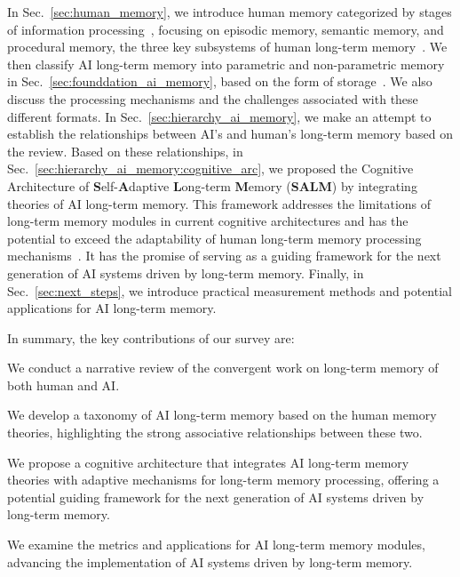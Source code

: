 \documentclass[journal,hideappendix]{vgtc}
\newenvironment{j_itemize}{
\begin{itemize}[]
  \setlength{\itemsep}{3pt}
  \setlength{\parskip}{0pt}
  \setlength{\parsep}{0pt}
}{\end{itemize}}
\begin{document}
In Sec.~\ref{sec:human_memory}, we introduce human memory categorized by stages of information processing~\cite{atkinson1968human}, focusing on episodic memory, semantic memory, and procedural memory, the three key subsystems of human long-term memory~\cite{tulving1972episodic,tulving1973encoding,tulving1985memory}. 
We then classify AI long-term memory into parametric and non-parametric memory in Sec.~\ref{sec:founddation_ai_memory}, based on the form of storage~\cite{lewis2020retrieval,mallen2023trust}. 
We also discuss the processing mechanisms and the challenges associated with these different formats. In Sec.~\ref{sec:hierarchy_ai_memory}, we make an attempt to establish the relationships between AI's and human's long-term memory based on the review. 
Based on these relationships, in Sec.~\ref{sec:hierarchy_ai_memory:cognitive_arc}, we proposed the Cognitive Architecture of \textbf{S}elf-\textbf{A}daptive \textbf{L}ong-term \textbf{M}emory (\textbf{SALM}) by integrating theories of AI long-term memory.
This framework addresses the limitations of long-term memory modules in current cognitive architectures and has the potential to exceed the adaptability of human long-term memory processing mechanisms~\cite{shiffrin1969memory,sweller2003evolution,manns2006evolution,allen2013evolution}. It has the promise of serving as a guiding framework for the next generation of AI systems driven by long-term memory. 
Finally, in Sec.~\ref{sec:next_steps}, we introduce practical measurement methods and potential applications for AI long-term memory.

In summary, the key contributions of our survey are:
\begin{j_itemize}
\item[$\bullet$] We conduct a narrative review of the convergent work on long-term memory of both human and AI.
\item[$\bullet$] We develop a taxonomy of AI long-term memory based on the human memory theories, highlighting the strong associative relationships between these two.
\item[$\bullet$] We propose a cognitive architecture that integrates AI long-term memory theories with adaptive mechanisms for long-term memory processing, offering a potential guiding framework for the next generation of AI systems driven by long-term memory.
\item[$\bullet$] We examine the metrics and applications for AI long-term memory modules, advancing the implementation of AI systems driven by long-term memory.
\end{j_itemize}
\end{document}
